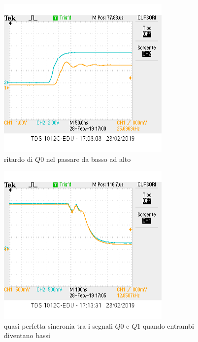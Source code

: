 \documentclass[10pt,a4paper]{article}
\begin{document}
\begin{figure}[h]

			\centering

			\includegraphics[scale=0.85]{tcounter_1}

			\caption{ritardo di $Q0$ nel passare da basso ad alto}

			\label{fig:t2}

\end{figure}



\begin{figure}[h]

			\centering

			\includegraphics[scale=0.85]{Q0Q1sincroni}

			\caption{quasi perfetta sincronia tra i segnali $Q0$ e $Q1$ quando entrambi diventano bassi}

			\label{fig:q0q1}

\end{figure}
\end{document}
